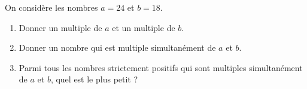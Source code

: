 \begin{exo}{}
	On considère les nombres $a = 24$ et $b = 18$.
	\begin{enumerate}
		\item Donner un multiple de $a$ et un multiple de $b$.
		\item Donner un nombre qui est multiple simultanément de $a$ et $b$.
		\item Parmi tous les nombres strictement positifs qui sont multiples simultanément de $a$ et $b$, quel est le plus petit ?
	\end{enumerate}
\end{exo}
